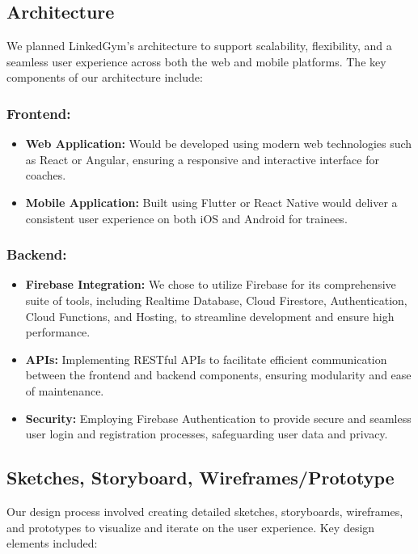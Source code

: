 \subsection{Architecture}
We planned LinkedGym's architecture to support scalability, flexibility, and a seamless user experience across both the web and mobile platforms. The key components of our architecture include:

\subsubsection{Frontend:}
\begin{itemize}
  \item \textbf{Web Application:} Would be developed using modern web technologies such as React or Angular, ensuring a responsive and interactive interface for coaches.
  
  \item \textbf{Mobile Application:} Built using Flutter or React Native would deliver a consistent user experience on both iOS and Android for trainees.
\end{itemize}

\subsubsection{Backend:}
\begin{itemize}
  \item \textbf{Firebase Integration:} We chose to utilize Firebase for its comprehensive suite of tools, including Realtime Database, Cloud Firestore, Authentication, Cloud Functions, and Hosting, to streamline development and ensure high performance.
  
  \item \textbf{APIs:} Implementing RESTful APIs to facilitate efficient communication between the frontend and backend components, ensuring modularity and ease of maintenance.
  
  \item \textbf{Security:} Employing Firebase Authentication to provide secure and seamless user login and registration processes, safeguarding user data and privacy.
\end{itemize}

\subsection{Sketches, Storyboard, Wireframes/Prototype}
Our design process involved creating detailed sketches, storyboards, wireframes, and prototypes to visualize and iterate on the user experience. Key design elements included:

